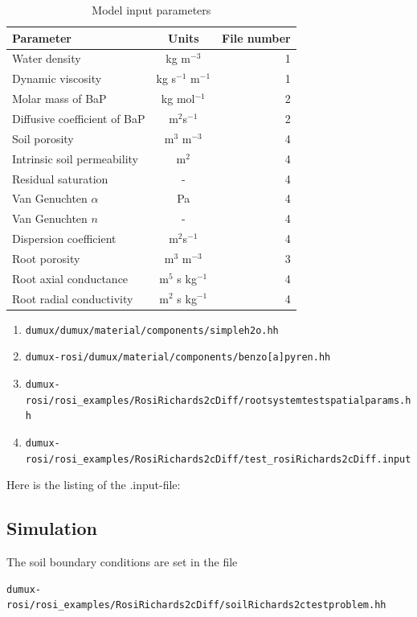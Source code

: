 \begin{table}[h!]
\caption{Model input parameters}
\label{tab:inputs} %
\begin{tabular}{l|c||r}
\textbf{Parameter}  & \textbf{Units}  & \textbf{File number}\tabularnewline
\hline 
Water density  & kg m$^{-3}$  & 1\tabularnewline
Dynamic viscosity  & kg s$^{-1}$ m$^{-1}$ & 1\tabularnewline
Molar mass of BaP & kg mol$^{-1}$ & 2\tabularnewline
Diffusive coefficient of BaP & m$^{2}$s$^{-1}$ & 2\tabularnewline
Soil porosity  & m$^{3}$ m$^{-3}$  & 4\tabularnewline
Intrinsic soil permeability  & m$^{2}$  & 4\tabularnewline
Residual saturation  & -  & 4\tabularnewline
Van Genuchten $\alpha$  & Pa  & 4\tabularnewline
Van Genuchten $n$  & -  & 4\tabularnewline
Dispersion coefficient & m$^{2}$s$^{-1}$ & 4\tabularnewline
Root porosity  & m$^{3}$ m$^{-3}$  & 3\tabularnewline
Root axial conductance  & m$^{5}$ s kg$^{-1}$  & 4\tabularnewline
Root radial conductivity  & m$^{2}$ s kg$^{-1}$  & 4\tabularnewline
\end{tabular}
\end{table}

\begin{enumerate}
\item \verb+dumux/dumux/material/components/simpleh2o.hh+ 
\item \verb+dumux-rosi/dumux/material/components/benzo[a]pyren.hh+ 
\item \verb+dumux-rosi/rosi_examples/RosiRichards2cDiff/rootsystemtestspatialparams.hh+ 
\item \verb+dumux-rosi/rosi_examples/RosiRichards2cDiff/test_rosiRichards2cDiff.input+ 
\end{enumerate}
Here is the listing of the .input-file: 



\subsection*{Simulation}

The soil boundary conditions are set in the file 
\begin{lstlisting}
dumux-rosi/rosi_examples/RosiRichards2cDiff/soilRichards2ctestproblem.hh
\end{lstlisting}
 


